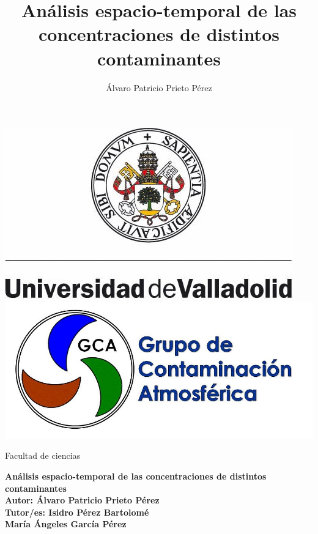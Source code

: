 \documentclass[12pt]{beamer}
\title{Análisis espacio-temporal de las concentraciones de distintos contaminantes}
\author{Álvaro Patricio Prieto Pérez}
\date{}
\begin{document}
\begin{frame}[squeeze]
\begin{center}

\begin{minipage}[c]{128mm}
\includegraphics[scale=0.35]{logo_uva} \hspace{3cm}
\includegraphics[scale=0.18]{logotipo-3-3}

\hspace{0.5mm} \scriptsize Facultad de ciencias
\end{minipage}

\end{center}
\begin{center}
\vspace{1cm}
{\Large \textbf{Análisis espacio-temporal de las concentraciones de distintos contaminantes}} \\
\vspace{0.5cm}
\normalsize \textbf{Autor: Álvaro Patricio Prieto Pérez} \\
\vspace{0.25cm}
\textbf{Tutor/es: Isidro Pérez Bartolomé \\ María Ángeles García Pérez}

\end{center}
\end{frame}
\end{document}
